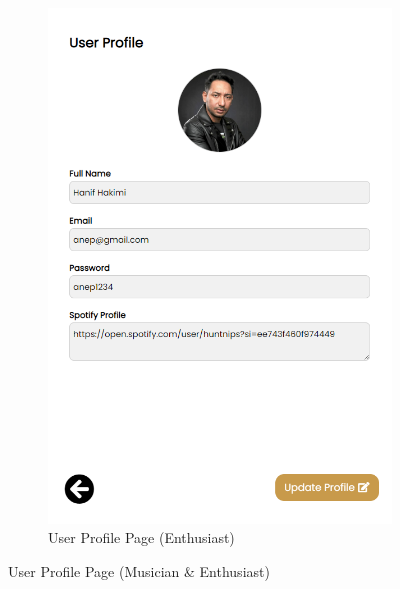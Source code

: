 \begin{enumerate}[1.]
\begin{figure}[h]
\begin{subfigure}[b]{0.4\textwidth}
            \includegraphics[width=\textwidth]{mainmatter/images/frontend/ss/User Profile3 (Musician-Enthusiast).png}
            \caption{User Profile Page (Enthusiast)}
            \label{fig:sub2}
        \end{subfigure}
        \caption{User Profile Page (Musician \& Enthusiast)}
        \label{fig:myfig53}
    \end{figure}
    \begin{figure}[h]\ContinuedFloat
        \centering
        \begin{subfigure}[b]{0.7\textwidth}
            \centering

\end{subfigure}
\end{figure}
\end{enumerate}
